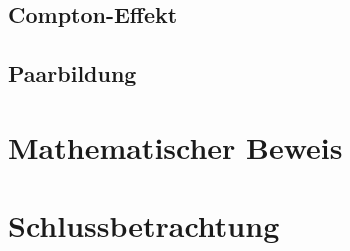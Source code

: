 \documentclass[11pt,a4paper,oneside]{report}
\begin{document}
\section{Compton-Effekt}

\section{Paarbildung}

\chapter{Mathematischer Beweis}

\chapter{Schlussbetrachtung}

\clearpage

\pagestyle{empty}


\listoftables

\listoffigures


\end{document}
